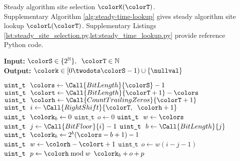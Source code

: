 \begin{algorithm}[H]
\caption{Steady algorithm site selection $\colorK(\colorT)$.\\ \footnotesize Supplementary Algorithm \ref{alg:steady-time-lookup} gives steady algorithm site lookup $\colorL(\colorT)$. Supplementary Listings \cref{lst:steady_site_selection.py,lst:steady_time_lookup.py} provide reference Python code.}
\label{alg:steady-site-selection}
\begin{minipage}{0.5\textwidth}
    \hspace*{\algorithmicindent} \textbf{Input:} $\colorS \in \{2^{\mathbb{N}}\},\;\; \colorT \in \mathbb{N}$ \\
    \hspace*{\algorithmicindent} \textbf{Output:} $\colork \in [0 \twodots \colorS - 1) \cup \{\nullval\}$ 
    \begin{algorithmic}[1]
        \State $\texttt{uint\_t} ~ ~ \colors \gets \Call{BitLength}{\colorS} - 1$
        \State $\texttt{uint\_t} ~ ~ \colort \gets \Call{BitLength}{\colorT+1} - \colors $ 
        \State $\texttt{uint\_t} ~ ~ \colorh \gets \Call{CountTrailingZeros}{\colorT + 1}$ 
         
        \State \Return \nullval {}
        \EndIf
        \State $\texttt{uint\_t} ~ ~ i \gets \Call{RightShift}{\colorT, \;\; \colorh + 1}$ 
         
        \State $\texttt{uint\_t} ~ ~ \colork_b \gets 0$ 
        \State $\texttt{uint\_t} ~ ~ o \gets 0$ 
        \State $\texttt{uint\_t} ~ ~ w \gets \colors$ 
        \Else
        \State $\texttt{uint\_t} ~ ~ j \gets \Call{BitFloor}{i} - 1$ 
        \State $\texttt{uint\_t} ~ ~ b \gets \Call{BitLength}{j}$ 
        \State $\texttt{uint\_t} ~ ~ \colork_b \gets 2^{b}(\colors - b + 1) - 1$ 
        \State $\texttt{uint\_t} ~ ~ w \gets \colorh - \colort + 1$ 
        \State $\texttt{uint\_t} ~ ~ o \gets w (i - j - 1)$ 
        \EndIf
        \State $\texttt{uint\_t} ~ ~ p \gets \colorh \bmod w$ 
        \State \Return $\colork_b + o + p$ 
    \end{algorithmic}
\end{minipage}
\end{algorithm}
